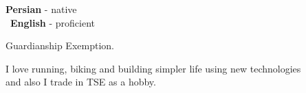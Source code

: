 \documentclass[9pt]{developercv}
\begin{document}
\begin{minipage}[t]{0.3\textwidth}
	\vspace{-\baselineskip} %


	\textbf{Persian} - native\\\
	\textbf{English} - proficient\\
\end{minipage}
\hfill
\begin{minipage}[t]{0.3\textwidth}
	\vspace{-\baselineskip} %


	Guardianship Exemption.
\end{minipage}
\hfill
\begin{minipage}[t]{0.3\textwidth}
	\vspace{-\baselineskip} %


	I love running, biking and building simpler life using new technologies\\
	and also I trade in TSE as a hobby.
\end{minipage}
\hfill
\end{document}
